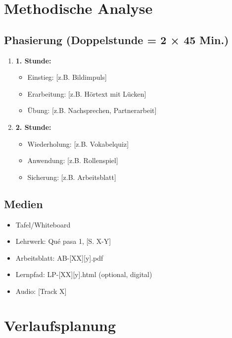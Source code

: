 \documentclass[11pt,a4paper]{article}
\newcommand{\lehrwerk}{Qué pasa 1}
\newcommand{\lehrwerkseite}{[S. X-Y]}
\begin{document}
\section{Methodische Analyse}

\subsection{Phasierung (Doppelstunde = 2 × 45 Min.)}
\begin{enumerate}
    \item \textbf{1. Stunde:}
    \begin{itemize}
        \item Einstieg: [z.B. Bildimpuls]
        \item Erarbeitung: [z.B. Hörtext mit Lücken]
        \item Übung: [z.B. Nachsprechen, Partnerarbeit]
    \end{itemize}
    \item \textbf{2. Stunde:}
    \begin{itemize}
        \item Wiederholung: [z.B. Vokabelquiz]
        \item Anwendung: [z.B. Rollenspiel]
        \item Sicherung: [z.B. Arbeitsblatt]
    \end{itemize}
\end{enumerate}

\subsection{Medien}
\begin{itemize}
    \item Tafel/Whiteboard
    \item Lehrwerk: \lehrwerk, \lehrwerkseite
    \item Arbeitsblatt: AB-[XX][y].pdf
    \item Lernpfad: LP-[XX][y].html (optional, digital)
    \item Audio: [Track X]
\end{itemize}

\section{Verlaufsplanung}
\end{document}

